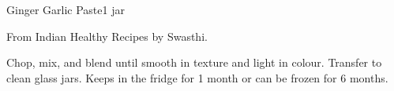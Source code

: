 \begin{recipe}{Ginger Garlic Paste}{1 jar}{}

\freeform From Indian Healthy Recipes by Swasthi.


Chop, mix, and blend until smooth in texture and light in colour. Transfer to clean glass jars. Keeps in the fridge for 1 month or can be frozen for 6 months.

\end{recipe}